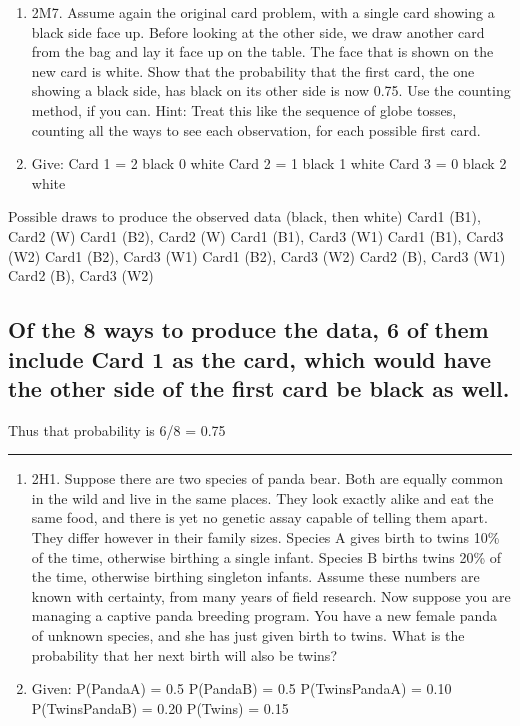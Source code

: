 \documentclass[
]{article}
\begin{document}
\begin{enumerate}
\def\labelenumi{\Alph{enumi})}
\setcounter{enumi}{16}
\item
  2M7. Assume again the original card problem, with a single card
  showing a black side face up. Before looking at the other side, we
  draw another card from the bag and lay it face up on the table. The
  face that is shown on the new card is white. Show that the probability
  that the first card, the one showing a black side, has black on its
  other side is now 0.75. Use the counting method, if you can. Hint:
  Treat this like the sequence of globe tosses, counting all the ways to
  see each observation, for each possible first card.
\item
  Give: Card 1 = 2 black 0 white Card 2 = 1 black 1 white Card 3 = 0
  black 2 white
\end{enumerate}

Possible draws to produce the observed data (black, then white) Card1
(B1), Card2 (W) Card1 (B2), Card2 (W) Card1 (B1), Card3 (W1) Card1 (B1),
Card3 (W2) Card1 (B2), Card3 (W1) Card1 (B2), Card3 (W2) Card2 (B),
Card3 (W1) Card2 (B), Card3 (W2)

\hypertarget{of-the-8-ways-to-produce-the-data-6-of-them-include-card-1-as-the-card-which-would-have-the-other-side-of-the-first-card-be-black-as-well.}{%
\subsection{Of the 8 ways to produce the data, 6 of them include Card 1
as the card, which would have the other side of the first card be black
as
well.}\label{of-the-8-ways-to-produce-the-data-6-of-them-include-card-1-as-the-card-which-would-have-the-other-side-of-the-first-card-be-black-as-well.}}

Thus that probability is 6/8 = 0.75

\begin{center}\rule{0.5\linewidth}{0.5pt}\end{center}

\begin{enumerate}
\def\labelenumi{\Alph{enumi})}
\setcounter{enumi}{16}
\item
  2H1. Suppose there are two species of panda bear. Both are equally
  common in the wild and live in the same places. They look exactly
  alike and eat the same food, and there is yet no genetic assay capable
  of telling them apart. They differ however in their family sizes.
  Species A gives birth to twins 10\% of the time, otherwise birthing a
  single infant. Species B births twins 20\% of the time, otherwise
  birthing singleton infants. Assume these numbers are known with
  certainty, from many years of field research. Now suppose you are
  managing a captive panda breeding program. You have a new female panda
  of unknown species, and she has just given birth to twins. What is the
  probability that her next birth will also be twins?
\item
  Given: P(PandaA) = 0.5 P(PandaB) = 0.5 P(Twins\textbar PandaA) = 0.10
  P(Twins\textbar PandaB) = 0.20 P(Twins) = 0.15
\end{enumerate}
\end{document}
